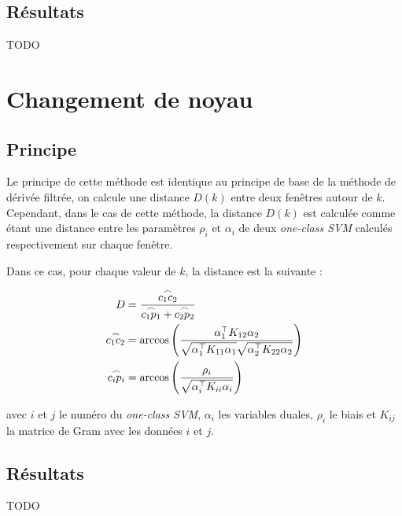 \subsection{Résultats}

TODO

\section{Changement de noyau}

\subsection{Principe}

Le principe de cette méthode est identique au principe de base de la méthode de dérivée filtrée, on calcule une distance $D(k)$ entre deux fenêtres autour de $k$. Cependant, dans le cas de cette méthode, la distance $D(k)$ est calculée comme étant une distance entre les paramètres $\rho_i$ et $\alpha_i$ de deux \textit{one-class SVM} calculés respectivement sur chaque fenêtre.

Dans ce cas, pour chaque valeur de $k$, la distance est la suivante :

\begin{align}
  D &= \frac{\overset{\frown}{c_1 c_2}}{\overset{\frown}{c_1 p_1} + \overset{\frown}{c_2 p_2}} \notag \\
  \overset{\frown}{c_1 c_2} &= \arccos\left(\frac{
  	\alpha_1^\top K_{12} \alpha_2
  	}{
  	\sqrt{\alpha_1^\top K_{11} \alpha_1} \sqrt{\alpha_2^\top K_{22} \alpha_2}
  	} \right) \notag \\
  \overset{\frown}{c_i p_i} &= \arccos\left( \frac{\rho_i}{\sqrt{\alpha_i^\top K_{ii} \alpha_i}}  \right) \notag
\end{align}

avec $i$ et $j$ le numéro du \textit{one-class SVM}, $\alpha_i$ les variables duales, $\rho_i$ le biais et $K_{ij}$ la matrice de Gram avec les données $i$ et $j$.

\subsection{Résultats}

TODO

\nocite{Loosli05}
